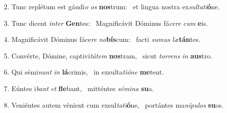 2. Tunc replétum est gáudi\textit{o} \textit{os} \textbf{nos}trum: \ast\  et lingua nostra ex\textit{sul}\textit{ta}\textit{ti}\textbf{ó}ne.\

3. Tunc dicent \textit{in}\textit{ter} \textbf{Gen}tes: \ast\  Magnificávit Dóminus fá\textit{ce}\textit{re} \textit{cum} \textbf{e}is.\

4. Magnificávit Dóminus fáce\textit{re} \textit{no}\textbf{bís}cum: \ast\  facti \textit{su}\textit{mus} \textit{læ}\textbf{tán}tes.\

5. Convérte, Dómine, captivi\textit{tá}\textit{tem} \textbf{nos}tram, \ast\  sicut \textit{tor}\textit{rens} \textit{in} \textbf{aus}tro.\

6. Qui sémi\textit{nant} \textit{in} \textbf{lá}crimis, \ast\  in exsulta\textit{ti}\textit{ó}\textit{ne} \textbf{me}tent.\

7. Eúntes i\textit{bant} \textit{et} \textbf{fle}bant, \ast\  mitténtes \textit{sé}\textit{mi}\textit{na} \textbf{su}a.\

8. Veniéntes autem vénient cum exsul\textit{ta}\textit{ti}\textbf{ó}ne, \ast\  portántes ma\textit{ní}\textit{pu}\textit{los} \textbf{su}os.\

